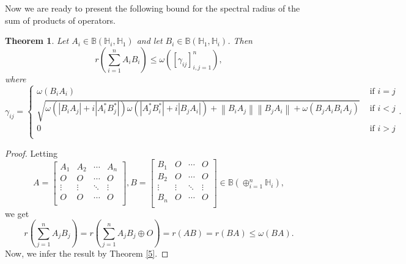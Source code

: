 \documentclass[12pt,twoside,reqno]{amsart}
\newtheorem{theorem}{Theorem}[section]
\numberwithin{equation}{section}
\begin{document}
\color{black}
Now we are ready to present the following bound for the spectral radius of the sum of products of operators.
\begin{theorem}\label{Thm_1_r}
Let ${{A}_{i}}\in \mathbb B\left( {{\mathbb H}_{i}},{{\mathbb H}_{1}} \right)$ and let ${{B}_{i}}\in \mathbb B\left( {{\mathbb H}_{1}},{{\mathbb H}_{i}} \right)$. Then
\[r\left( \sum\limits_{i=1}^{n}{{{A}_{i}}{{B}_{i}}} \right)\le \omega \left( \left[ {{\gamma }_{ij}} \right]_{i,j=1}^{n} \right),\]
where
{\small
\begin{equation*}
{{\gamma }_{ij}}=\left\{ \begin{array}{ll}
   \omega \left( {{B}_{i}}{{A}_{i}} \right)&\text{ if }i=j \\ 
  \sqrt{\omega \left( \left| {{B}_{i}}{{A}_{j}} \right|+i\left| A_{i}^{*}B_{j}^{*} \right| \right)\omega \left( \left| A_{j}^{*}B_{i}^{*} \right|+i\left| {{B}_{j}}{{A}_{i}} \right| \right)+\left\| {{B}_{i}}{{A}_{j}} \right\|\left\| {{B}_{j}}{{A}_{i}} \right\|+\omega \left( {{B}_{j}}{{A}_{i}}{{B}_{i}}{{A}_{j}} \right)}&\text{ if }i<j \\ 
  0&\text{ if }i>j \\ 
\end{array} \right..
\end{equation*}}
\end{theorem}
\begin{proof}
Letting 
\[A=\left[ \begin{matrix}
   {{A}_{1}} & {{A}_{2}} & \cdots  & {{A}_{n}}  \\
   O & O & \cdots  & O  \\
   \vdots  & \vdots  & \ddots  & \vdots   \\
   O & O & \cdots  & O  \\
\end{matrix} \right],B=\left[ \begin{matrix}
   {{B}_{1}} & O & \cdots  & O  \\
   {{B}_{2}} & O & \cdots  & O  \\
   \vdots  & \vdots  & \ddots  & \vdots   \\
   {{B}_{n}} & O & \cdots  & O  \\
\end{matrix} \right]\in \mathbb B\left( \oplus _{i=1}^{n}{{\mathbb H}_{i}} \right),\]
we get
	\[r\left( \sum\limits_{j=1}^{n}{{{A}_{j}}{{B}_{j}}} \right)=r\left( \sum\limits_{j=1}^{n}{{{A}_{j}}{{B}_{j}}\oplus O} \right)=r\left( AB \right)=r\left( BA \right)\le \omega \left( BA \right).\]
Now, we infer the result by Theorem \ref{5}.
\end{proof}
\end{document}
